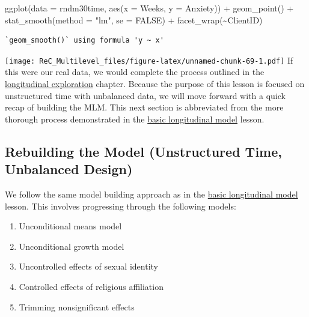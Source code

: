 \documentclass[
  11pt,
]{book}
\newenvironment{Shaded}{\begin{snugshade}}{\end{snugshade}}
\newcommand{\AttributeTok}[1]{\textcolor[rgb]{0.77,0.63,0.00}{#1}}
\newcommand{\ConstantTok}[1]{\textcolor[rgb]{0.00,0.00,0.00}{#1}}
\newcommand{\FunctionTok}[1]{\textcolor[rgb]{0.00,0.00,0.00}{#1}}
\newcommand{\NormalTok}[1]{#1}
\newcommand{\SpecialCharTok}[1]{\textcolor[rgb]{0.00,0.00,0.00}{#1}}
\newcommand{\StringTok}[1]{\textcolor[rgb]{0.31,0.60,0.02}{#1}}
\providecommand{\tightlist}{%
  \setlength{\itemsep}{0pt}\setlength{\parskip}{0pt}}
\begin{document}
\begin{Shaded}
\begin{Highlighting}[]
\FunctionTok{ggplot}\NormalTok{(}\AttributeTok{data =}\NormalTok{ rndm30time, }\FunctionTok{aes}\NormalTok{(}\AttributeTok{x =}\NormalTok{ Weeks, }\AttributeTok{y =}\NormalTok{ Anxiety)) }\SpecialCharTok{+} \FunctionTok{geom\_point}\NormalTok{() }\SpecialCharTok{+}
    \FunctionTok{stat\_smooth}\NormalTok{(}\AttributeTok{method =} \StringTok{"lm"}\NormalTok{, }\AttributeTok{se =} \ConstantTok{FALSE}\NormalTok{) }\SpecialCharTok{+} \FunctionTok{facet\_wrap}\NormalTok{(}\SpecialCharTok{\textasciitilde{}}\NormalTok{ClientID)}
\end{Highlighting}
\end{Shaded}

\begin{verbatim}
`geom_smooth()` using formula 'y ~ x'
\end{verbatim}

\texttt{[image: ReC\_Multilevel\_files/figure-latex/unnamed-chunk-69-1.pdf]}
If this were our real data, we would complete the process outlined in the \href{MLMexplore}{longitudinal exploration} chapter. Because the purpose of this lesson is focused on unstructured time with unbalanced data, we will move forward with a quick recap of building the MLM. This next section is abbreviated from the more thorough process demonstrated in the \href{LongMod}{basic longitudinal model} lesson.

\hypertarget{rebuilding-the-model-unstructured-time-unbalanced-design}{%
\subsection{Rebuilding the Model (Unstructured Time, Unbalanced Design)}\label{rebuilding-the-model-unstructured-time-unbalanced-design}}

We follow the same model building approach as in the \href{LongMod}{basic longitudinal model} lesson. This involves progressing through the following models:

\begin{enumerate}
\def\labelenumi{\arabic{enumi}.}
\tightlist
\item
  Unconditional means model
\item
  Unconditional growth model
\item
  Uncontrolled effects of sexual identity
\item
  Controlled effects of religious affiliation
\item
  Trimming nonsignificant effects
\end{enumerate}
\end{document}
